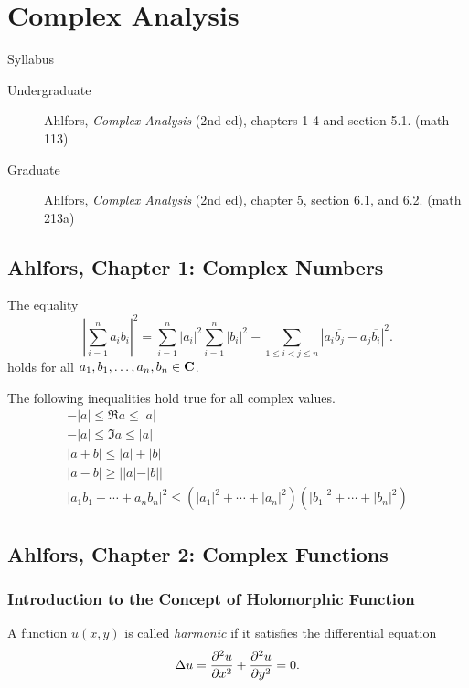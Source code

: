 \section{Complex Analysis}
\label{S:complex-analysis}

Syllabus
\begin{description}
\item[Undergraduate] Ahlfors, \emph{Complex Analysis} (2nd ed), chapters 1-4 and section 5.1. (math 113)
\item[Graduate] Ahlfors, \emph{Complex Analysis} (2nd ed), chapter 5, section 6.1, and 6.2. (math 213a)
\end{description}

\subsection{Ahlfors, Chapter 1: Complex Numbers}

\begin{proposition}
  The equality
  \[
  \left| \sum_{i=1}^n a_i b_i \right|^2 = \sum_{i=1}^n |a_i|^2 \sum_{i=1}^n |b_i|^2 - \sum_{1 \leq i < j \leq n} \left| a_i \overline{b_j} - a_j \overline{b_i} \right|^2.
  \]
  holds for all $a_1, b_1, \dots, a_n, b_n \in \mathbf{C}$.
\end{proposition}

The following inequalities hold true for all complex values.
\begin{gather*}
-|a| \leq \Re a \leq |a| \\
-|a| \leq \Im a \leq |a| \\
|a+b| \leq |a|+|b| \\
|a-b| \geq ||a|-|b|| \\
|a_1 b_1 + \cdots + a_n b_n|^2 \leq (|a_1|^2 + \cdots + |a_n|^2)(|b_1|^2 + \cdots + |b_n|^2)
\end{gather*}

\subsection{Ahlfors, Chapter 2: Complex Functions}

\subsubsection{Introduction to the Concept of Holomorphic Function}

\begin{definition}
  A function $u(x,y)$ is called \emph{harmonic} if it satisfies the differential equation
  \[
  \Delta u = \frac{\partial^2 u}{\partial x^2} + \frac{\partial^2 u}{\partial y^2} = 0.
  \]
\end{definition}

